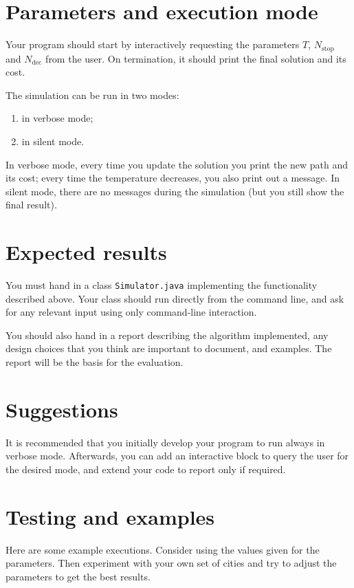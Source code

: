 \documentclass[a4paper]{article}
\begin{document}
\section*{Parameters and execution mode}


Your program should start by interactively requesting the parameters $T$, $N_{\mathrm{stop}}$ and
$N_{\mathrm{dec}}$ from the user.
On termination, it should print the final solution and its cost.

The simulation can be run in two modes:
\begin{enumerate}
\item in verbose mode;
\item in silent mode.
\end{enumerate}
In verbose mode, every time you update the solution you print the new path and its cost; every time
the temperature decreases, you also print out a message.
In silent mode, there are no messages during the simulation (but you still show the final result).

\section*{Expected results}

You must hand in a class \verb!Simulator.java! implementing the functionality described above.
Your class should run directly from the command line, and ask for any relevant input using only
command-line interaction.

You should also hand in a report describing the algorithm implemented, any design choices that you
think are important to document, and examples. The report will be the basis for the evaluation.

\section*{Suggestions}

It is recommended that you initially develop your program to run always in verbose mode.
Afterwards, you can add an interactive block to query the user for the desired mode, and extend your
code to report only if required.

\section*{Testing and examples}

Here are some example executions. Consider using the values given for the parameters. Then
experiment with your own set of cities and try to adjust the parameters to get the best results.
\end{document}
